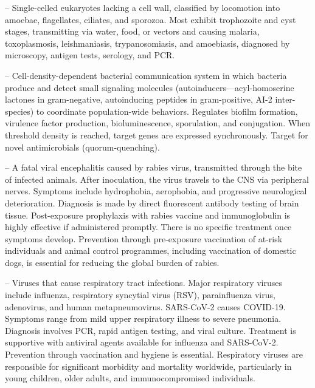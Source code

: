-- Single-celled eukaryotes lacking a cell wall, classified by locomotion into amoebae, flagellates, ciliates, and sporozoa. Most exhibit trophozoite and cyst stages, transmitting via water, food, or vectors and causing malaria, toxoplasmosis, leishmaniasis, trypanosomiasis, and amoebiasis, diagnosed by microscopy, antigen tests, serology, and PCR.

-- Cell-density-dependent bacterial communication system in which bacteria produce and detect small signaling molecules (autoinducers—acyl-homoserine lactones in gram-negative, autoinducing peptides in gram-positive, AI-2 inter-species) to coordinate population-wide behaviors. Regulates biofilm formation, virulence factor production, bioluminescence, sporulation, and conjugation. When threshold density is reached, target genes are expressed synchronously. Target for novel antimicrobials (quorum-quenching).

-- A fatal viral encephalitis caused by rabies virus, transmitted through the bite of infected animals. After inoculation, the virus travels to the CNS via peripheral nerves. Symptoms include hydrophobia, aerophobia, and progressive neurological deterioration. Diagnosis is made by direct fluorescent antibody testing of brain tissue. Post-exposure prophylaxis with rabies vaccine and immunoglobulin is highly effective if administered promptly. There is no specific treatment once symptoms develop. Prevention through pre-exposure vaccination of at-risk individuals and animal control programmes, including vaccination of domestic dogs, is essential for reducing the global burden of rabies.

-- Viruses that cause respiratory tract infections. Major respiratory viruses include influenza, respiratory syncytial virus (RSV), parainfluenza virus, adenovirus, and human metapneumovirus. SARS-CoV-2 causes COVID-19. Symptoms range from mild upper respiratory illness to severe pneumonia. Diagnosis involves PCR, rapid antigen testing, and viral culture. Treatment is supportive with antiviral agents available for influenza and SARS-CoV-2. Prevention through vaccination and hygiene is essential. Respiratory viruses are responsible for significant morbidity and mortality worldwide, particularly in young children, older adults, and immunocompromised individuals.

